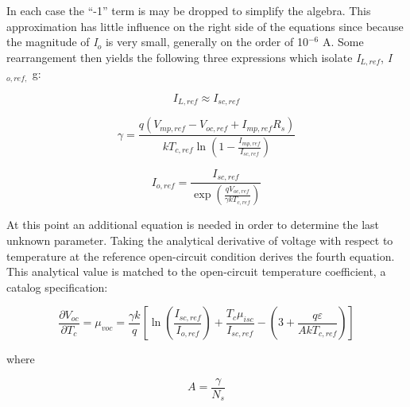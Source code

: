 In each case the ``-1'' term is may be dropped to simplify the algebra. This approximation has little influence on the right side of the equations since because the magnitude of \emph{I\(_{o}\)} is very small, generally on the order of 10\(^{-6}\) A. Some rearrangement then yields the following three expressions which isolate \emph{I\(_{L,ref}\)}, \emph{I\(_{o,ref,}\)} g:

\begin{equation}
{I_{L,ref}} \approx {I_{sc,ref}}
\end{equation}

\begin{equation}
\gamma  = \frac{{q\left( {{V_{mp,ref}} - {V_{oc,ref}} + I_{mp,ref}^{}{R_s}} \right)}}{{k{T_{c,ref}}\ln \left( {1 - \frac{{{I_{mp,ref}}}}{{{I_{sc,ref}}}}} \right)}}
\end{equation}

\begin{equation}
{I_{o,ref}} = \frac{{{I_{sc,ref}}}}{{\exp \left( {\frac{{q{V_{oc,ref}}}}{{\gamma k{T_{c,ref}}}}} \right)}}
\end{equation}

At this point an additional equation is needed in order to determine the last unknown parameter. Taking the analytical derivative of voltage with respect to temperature at the reference open-circuit condition derives the fourth equation. This analytical value is matched to the open-circuit temperature coefficient, a catalog specification:

\begin{equation}
\frac{{\partial {V_{oc}}}}{{\partial {T_c}}} = {\mu_{voc}} = \frac{{\gamma k}}{q}\left[ {\ln \left( {\frac{{{I_{sc,ref}}}}{{{I_{o,ref}}}}} \right) + \frac{{{T_c}\mu_{isc}^{}}}{{{I_{sc,ref}}}} - \left( {3 + \frac{{q\varepsilon }}{{Ak{T_{c,ref}}}}} \right)} \right]
\end{equation}

where

\begin{equation}
A = \frac{\gamma }{{{N_s}}}
\end{equation}

